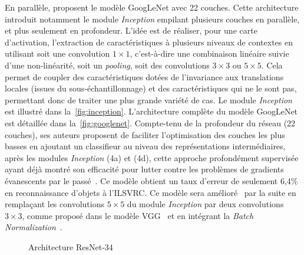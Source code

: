 En parallèle, \citet{szegedy_going_2015} proposent le modèle GoogLeNet avec 22 couches. Cette architecture introduit notamment le module \emph{Inception} empilant plusieurs couches en parallèle, et plus seulement en profondeur. L'idée est de réaliser, pour une carte d'activation, l'extraction de caractéristiques à plusieurs niveaux de contextes en utilisant soit une convolution $1\times1$, c'est-à-dire une combinaison linéaire suivie d'une non-linéarité, soit un \emph{pooling}, soit des convolutions $3\times3$ ou $5\times5$. Cela permet de coupler des caractéristiques dotées de l'invariance aux translations locales (issues du sous-échantillonnage) et des caractéristiques qui ne le sont pas, permettant donc de traiter une plus grande variété de cas. Le module \emph{Inception} est illustré dans la~\cref{fig:inception}.
L'architecture complète du modèle GoogLeNet est détaillée dans la~\cref{fig:googlenet}. Compte-tenu de la profondeur du réseau (22 couches), ses auteurs proposent de faciliter l'optimisation des couches les plus basses en ajoutant un classifieur au niveau des représentations intermédiaires, après les modules \emph{Inception} (4a) et (4d), cette approche profondément supervisée ayant déjà montré son efficacité pour lutter contre les problèmes de gradients évanescents par le passé~\cite{lee_deeply-supervised_2015}. Ce modèle obtient un taux d'erreur de seulement 6,4\% en reconnaissance d'objets à l'\gls{ILSVRC}.
Ce modèle sera amélioré~\cite{szegedy_rethinking_2016} par la suite en remplaçant les convolutions $5\times5$ du module \emph{Inception} par deux convolutions $3\times3$, comme proposé dans le modèle VGG~\cite{simonyan_very_2014} et en intégrant la \emph{Batch Normalization}~\cite{ioffe_batch_2015}.

\begin{figure}[t]
  \resizebox{\textwidth}{!}{
    
  }
  \caption{Architecture ResNet-34~\cite{he_deep_2016}}
  \label{fig:resnet}
\end{figure}


